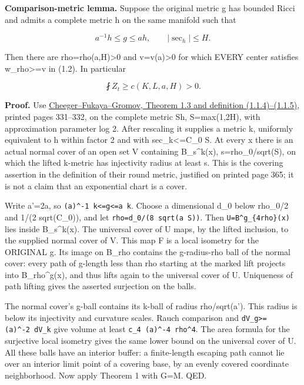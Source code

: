\documentclass[
  10pt,
]{article}
\begin{document}
\textbf{Comparison-metric lemma.} Suppose the original metric g has
bounded Ricci and admits a complete metric h on the same manifold such
that

\[
                      a^{-1}h\le g\le ah,
                  \qquad |\sec_h|\le H.              \tag{4.3}
\]

Then there are rho=rho(a,H)\textgreater0 and v=v(a)\textgreater0 for
which EVERY center satisfies w\_rho\textgreater=v in (1.2). In
particular

\[
                         \fint Z_t\ge c(K,L,a,H)>0.   \tag{4.4}
\]

\textbf{Proof.} Use
\href{https://www.ihes.fr/~gromov/wp-content/uploads/2018/08/384.pdf}{Cheeger--Fukaya--Gromov,
Theorem 1.3 and definition (1.1.4)--(1.1.5)}, printed pages 331--332, on
the complete metric Sh, S=max(1,2H), with approximation parameter log 2.
After rescaling it supplies a metric k, uniformly equivalent to h within
factor 2 and with \textbar sec\_k\textbar\textless=C\_0 S. At every x
there is an actual normal cover of an open set V containing
B\_s\^{}k(x), s=rho\_0/sqrt(S), on which the lifted k-metric has
injectivity radius at least s. This is the covering assertion in the
definition of their round metric, justified on printed page 365; it is
not a claim that an exponential chart is a cover.

Write a'=2a, so
\texttt{(a\textquotesingle{})\^{}-1\ k\textless{}=g\textless{}=a\textquotesingle{}\ k}.
Choose a dimensional d\_0 below rho\_0/2 and 1/(2 sqrt(C\_0)), and let
\texttt{rho=d\_0/(8\ sqrt(a\textquotesingle{}\ S))}. Then
\texttt{U=B\^{}g\_\{4rho\}(x)} lies inside B\_s\^{}k(x). The universal
cover of U maps, by the lifted inclusion, to the supplied normal cover
of V. This map F is a local isometry for the ORIGINAL g. Its image on
B\_rho contains the g-radius-rho ball of the normal cover: every path of
g-length less than rho starting at the marked lift projects into
B\_rho\^{}g(x), and thus lifts again to the universal cover of U.
Uniqueness of path lifting gives the asserted surjection on the balls.

The normal cover's g-ball contains its k-ball of radius rho/sqrt(a').
This radius is below its injectivity and curvature scales. Rauch
comparison and
\texttt{dV\_g\textgreater{}=(a\textquotesingle{})\^{}-2\ dV\_k} give
volume at least \texttt{c\_4\ (a\textquotesingle{})\^{}-4\ rho\^{}4}.
The area formula for the surjective local isometry gives the same lower
bound on the universal cover of U. All these balls have an interior
buffer: a finite-length escaping path cannot lie over an interior limit
point of a covering base, by an evenly covered coordinate neighborhood.
Now apply Theorem 1 with G=M. QED.
\end{document}
